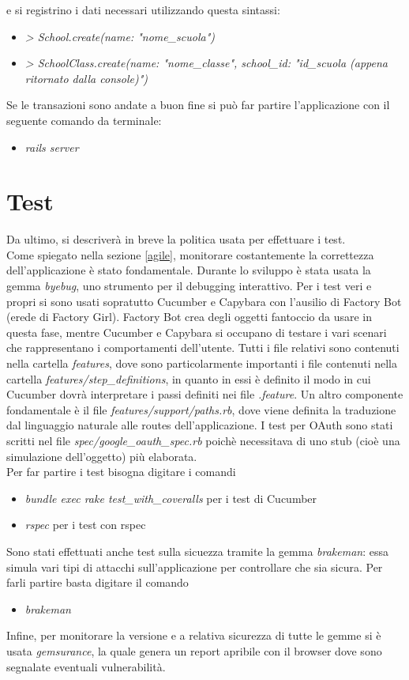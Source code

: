 \documentclass[Lau, binding=0.6cm, oneside]{sapthesis}
\begin{document}
e si registrino i dati necessari utilizzando questa sintassi:
\begin{itemize}
	\item \textit{> School.create(name: "nome\_scuola")}
	\item \textit{> SchoolClass.create(name: "nome\_classe", school\_id: "id\_scuola (appena ritornato dalla console)")}
\end{itemize}

Se le transazioni sono andate a buon fine si può far partire l'applicazione con il seguente comando da terminale: 
\begin{itemize}
	\item \textit{rails server}
\end{itemize}

\section{Test} \label{test}

Da ultimo, si descriverà in breve la politica usata per effettuare i test.\\ 
Come spiegato nella sezione \ref{agile}, monitorare costantemente la correttezza dell'applicazione è stato fondamentale. Durante lo sviluppo è stata usata la gemma \textit{byebug}, uno strumento per il debugging interattivo. Per i test veri e propri si sono usati sopratutto Cucumber e Capybara con l'ausilio di Factory Bot (erede di Factory Girl). Factory Bot crea degli oggetti fantoccio da usare in questa fase, mentre Cucumber e Capybara si occupano di testare i vari scenari che rappresentano i comportamenti dell'utente. Tutti i file relativi sono contenuti nella cartella \textit{features}, dove sono particolarmente importanti i file contenuti nella cartella \textit{features/step\_definitions}, in quanto in essi è definito il modo in cui Cucumber dovrà interpretare i passi definiti nei file \textit{.feature}. Un altro componente fondamentale è il file \textit{features/support/paths.rb}, dove viene definita la traduzione dal linguaggio naturale alle routes dell'applicazione. I test per OAuth sono stati scritti nel file \textit{spec/google\_oauth\_spec.rb} poichè necessitava di uno stub (cioè una simulazione dell'oggetto) più elaborata.\\
Per far partire i test bisogna digitare i comandi 
\begin{itemize}
	\item \textit{bundle exec rake test\_with\_coveralls} per i test di Cucumber
	\item \textit{rspec} per i test con rspec
\end{itemize}

Sono stati effettuati anche test sulla sicuezza tramite la gemma \textit{brakeman}: essa simula vari tipi di attacchi sull'applicazione per controllare che sia sicura. Per farli partire basta digitare il comando 
\begin{itemize}
	\item \textit{brakeman}
\end{itemize}

Infine, per monitorare la versione e a relativa sicurezza di tutte le gemme si è usata \textit{gemsurance}, la quale genera un report apribile con il browser dove sono segnalate eventuali vulnerabilità. 
\end{document}
